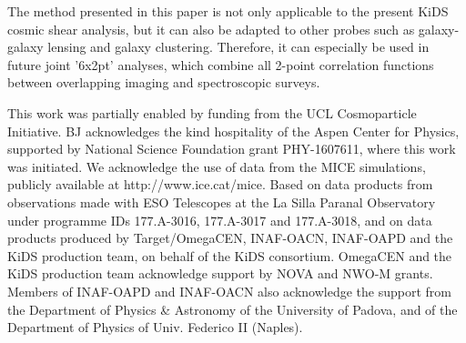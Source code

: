 \documentclass{aa}
\begin{document}
The method presented in this paper is not only applicable to the present KiDS cosmic shear analysis, but it can also be adapted to other probes such as galaxy-galaxy lensing and galaxy clustering. Therefore, it can especially be used in future joint '6x2pt' analyses, which combine all 2-point correlation functions between overlapping imaging and spectroscopic surveys.
\begin{acknowledgements}
This work was partially enabled by funding from the UCL Cosmoparticle Initiative.
BJ acknowledges the kind hospitality of the Aspen Center for Physics, supported by National Science Foundation grant PHY-1607611, where this work was initiated.
We acknowledge the use of data from the MICE simulations, publicly available at http://www.ice.cat/mice.
Based on data products from observations made with ESO Telescopes at the La Silla Paranal Observatory under programme IDs 177.A-3016, 177.A-3017 and 177.A-3018, and on data products produced by Target/OmegaCEN, INAF-OACN, INAF-OAPD and the KiDS production team, on behalf of the KiDS consortium. OmegaCEN and the KiDS production team acknowledge support by NOVA and NWO-M grants. Members of INAF-OAPD and INAF-OACN also acknowledge the support from the Department of Physics \& Astronomy of the University of Padova, and of the Department of Physics of Univ. Federico II (Naples).
\end{acknowledgements}




\end{document}
